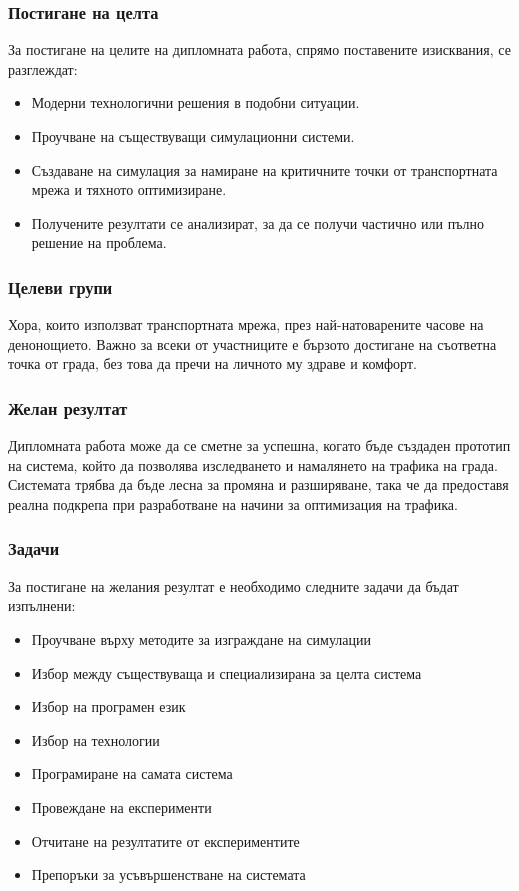 	\subsubsection{Постигане на целта}

		За постигане на целите на дипломната работа, спрямо поставените изисквания, се разглеждат:
		\begin{itemize}
			\item Модерни технологични решения в подобни ситуации.
			\item Проучване на съществуващи симулационни системи.
			\item Създаване на симулация за намиране на критичните точки от транспортната мрежа и тяхното оптимизиране.
			\item Получените резултати се анализират, за да се получи частично или пълно решение на проблема.
		\end{itemize}

	\subsubsection{Целеви групи}
	
		Хора, които използват транспортната мрежа, през най-натоварените часове на денонощието. Важно за всеки от участниците е бързото достигане на съответна точка от града, без това да пречи на личното му здраве и комфорт.
	
	\subsubsection{Желан резултат}
	
		Дипломната работа може да се сметне за успешна, когато бъде създаден прототип на система, който да позволява 
		изследването и намалянето на трафика на града. Системата трябва да бъде лесна за промяна и разширяване,
		така че да предоставя реална подкрепа при разработване на начини за оптимизация на трафика.
		
	
	\subsubsection{Задачи}
		
		За постигане на желания резултат е необходимо следните задачи да бъдат изпълнени:	
	
		\begin{itemize}
			\item Проучване върху методите за изграждане на симулации
			\item Избор между съществуваща и специализирана за целта система
			\item Избор на програмен език
			\item Избор на технологии
			\item Програмиране на самата система
			\item Провеждане на експерименти
			\item Отчитане на резултатите от експериментите
			\item Препоръки за усъвършенстване на системата
		\end{itemize}